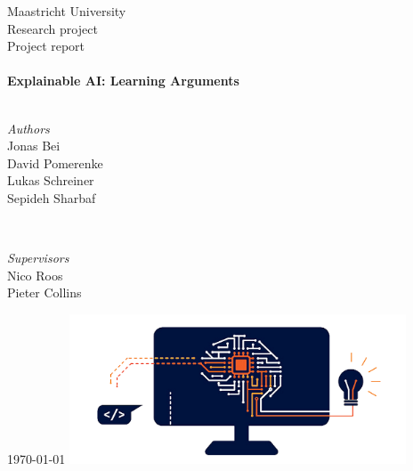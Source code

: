 \begin{titlepage} %
	\center %
	\LARGE Maastricht University\\[1.5cm] 
	\Large Research project \\Project report\\[0.5cm]
    \HRule\\[0.35cm]
	{\huge\bfseries Explainable AI: Learning Arguments}\\
    \HRule\\[1.5cm]
	\begin{minipage}[t]{0.45\textwidth}
		\begin{flushleft}
			\large
			\textit{Authors}\\Jonas Bei\\ David Pomerenke\\ Lukas Schreiner\\ Sepideh Sharbaf
		\end{flushleft}
	\end{minipage}
	~
	\begin{minipage}[t]{0.45\textwidth}
		\begin{flushright}
			\large
			\textit{Supervisors}\\
			Nico Roos\\ Pieter Collins
		\end{flushright}
	\end{minipage}
	\vfill\vfill\vfill
	{\large\today} %
	\vfill\vfill\vfill %
	\includegraphics[width=0.75\textwidth]{dke-logo.png}\\
	
	\vfill %
\end{titlepage}